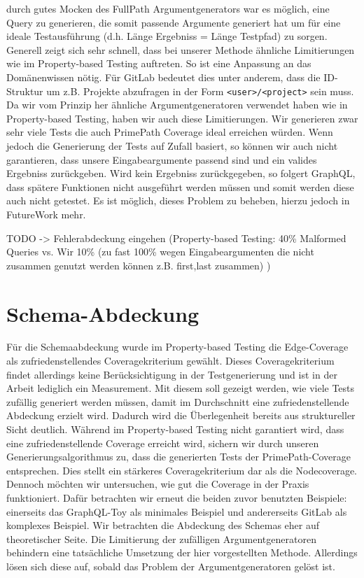 durch gutes Mocken des FullPath Argumentgenerators war es möglich, eine Query zu generieren, die somit passende Argumente generiert hat
um für eine ideale Testausführung (d.h. Länge Ergebniss = Länge Testpfad) zu sorgen.
Generell zeigt sich sehr schnell, dass bei unserer Methode ähnliche Limitierungen wie im Property-based Testing auftreten.
So ist eine Anpassung an das Domänenwissen nötig.
Für GitLab bedeutet dies unter anderem, dass die ID-Struktur um z.B. Projekte abzufragen in der Form \verb+<user>/<project>+ sein muss. \cite[vgl. S.8]{property-based-testing}
Da wir vom Prinzip her ähnliche Argumentgeneratoren verwendet haben wie in Property-based Testing, haben wir auch diese Limitierungen.
Wir generieren zwar sehr viele Tests die auch PrimePath Coverage ideal erreichen würden.
Wenn jedoch die Generierung der Tests auf Zufall basiert, so können wir auch nicht garantieren, dass unsere Eingabeargumente passend sind und ein valides Ergebniss zurückgeben.
Wird kein Ergebniss zurückgegeben, so folgert GraphQL, dass spätere Funktionen nicht ausgeführt werden müssen und somit werden diese auch nicht getestet.
Es ist möglich, dieses Problem zu beheben, hierzu jedoch in FutureWork mehr.

TODO -> Fehlerabdeckung eingehen (Property-based Testing: 40\% Malformed Queries vs. Wir 10\% (zu fast 100\% wegen Eingabeargumenten die nicht zusammen genutzt werden können
z.B. first,last zusammen) )



\section{Schema-Abdeckung}

Für die Schemaabdeckung wurde im Property-based Testing die Edge-Coverage als zufriedenstellendes Coveragekriterium gewählt.
Dieses Coveragekriterium findet allerdings keine Berücksichtigung in der Testgenerierung und ist in der Arbeit lediglich ein Measurement.
Mit diesem soll gezeigt werden, wie viele Tests zufällig generiert werden müssen, damit im Durchschnitt eine zufriedenstellende Abdeckung erzielt wird.
Dadurch wird die Überlegenheit bereits aus struktureller Sicht deutlich.
Während im Property-based Testing nicht garantiert wird, dass eine zufriedenstellende Coverage erreicht wird,
sichern wir durch unseren Generierungsalgorithmus zu, dass die generierten Tests der PrimePath-Coverage entsprechen.
Dies stellt ein stärkeres Coveragekriterium dar als die Nodecoverage.
Dennoch möchten wir untersuchen, wie gut die Coverage in der Praxis funktioniert.
Dafür betrachten wir erneut die beiden zuvor benutzten Beispiele: einerseits das GraphQL-Toy als minimales Beispiel und andererseits GitLab als komplexes Beispiel.
Wir betrachten die Abdeckung des Schemas eher auf theoretischer Seite.
Die Limitierung der zufälligen Argumentgeneratoren behindern eine tatsächliche Umsetzung der hier vorgestellten Methode.
Allerdings lösen sich diese auf, sobald das Problem der Argumentgeneratoren gelöst ist.

